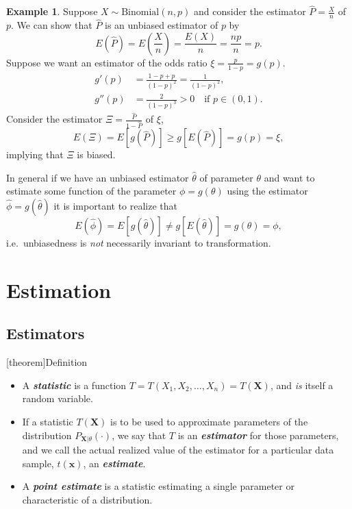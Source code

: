 \documentclass[12pt]{report}
\theoremstyle{definition}
\begin{document}
\newtheorem{Jensen's inequality eg}[theorem]{Example}
\begin{Jensen's inequality eg}
    Suppose $X\sim\text{Binomial}(n,p)$ and consider the estimator
    $\hat{P}=\frac{X}{n}$ of $p$. We can show that $\hat{P}$ is an unbiased
    estimator of $p$ by
    \[
        E(\hat{P})=E\left(\frac{X}{n}\right)=\frac{E(X)}{n}=\frac{np}{n}=p.
    \]
    Suppose we want an estimator of the odds ratio $\xi=\frac{p}{1-p}=g(p)$.
    \begin{align*}
        g'(p)&=\frac{1-p+p}{{(1-p)}^{2}}=\frac{1}{{(1-p)}^{2}},\\
        g''(p)&=\frac{2}{{(1-p)}^{3}}>0 \quad\text{if }p\in(0,1).
    \end{align*} 
    Consider the estimator $\Xi=\frac{\hat{P}}{1-\hat{P}}$ of $\xi$,
    \[
        E(\Xi)=E[g(\hat{P})]\ge g[E(\hat{P})]=g(p)=\xi,
    \]
    implying that $\Xi$ is biased.
\end{Jensen's inequality eg}

In general if we have an unbiased estimator $\hat{\theta}$ of parameter
$\theta$ and want to estimate some function of the parameter $\phi=g(\theta)$
using the estimator $\hat{\phi}=g(\hat{\theta})$ it is important to realize that
\[
    E(\hat{\phi})=E[g(\hat{\theta})]\neq g[E(\hat{\theta})]=g(\theta)=\phi,
\]
i.e.\ unbiasedness is \emph{not} necessarily invariant to transformation.


\chapter{Estimation}

\section{Estimators}

[theorem]{Definition}
\begin{statistic}
    \quad
    \begin{itemize}
        \item 
            A \textbf{\emph{statistic}} is a function
            $T=T(X_1,X_2,\ldots,X_n)=T(\mathbf{X})$, and \emph{is} itself a random
            variable.
        \item 
            If a statistic $T(\mathbf{X})$ is to be used to approximate parameters of the distribution
            $P_{\mathbf{X}|\theta}(\cdot)$, we say that $T$ is an
            \textbf{\emph{estimator}} for those parameters, and we call the actual
            realized value of the estimator for a particular data sample,
            $t(\mathbf{x})$, an \textbf{\emph{estimate}}.
        \item 
            A \textbf{\emph{point estimate}} is a statistic estimating a single
            parameter or characteristic of a distribution.
    \end{itemize} 
\end{statistic}
\end{document}
